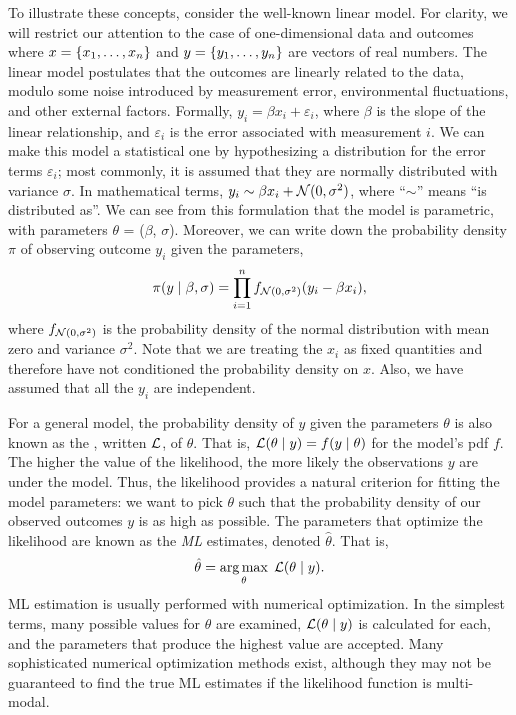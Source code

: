To illustrate these concepts, consider the well-known linear model. For
clarity, we will restrict our attention to the case of one-dimensional data and
outcomes where $x = \left\lbrace x_1, \ldots, x_n\right\rbrace$ and $y = \left\lbrace y_1, \ldots, y_n\right\rbrace$
are vectors of real numbers. The linear model postulates that the outcomes are
linearly related to the data, modulo some noise introduced by measurement
error, environmental fluctuations, and other external factors. Formally, $y_i =
\beta x_i + \varepsilon_i$, where $\beta$ is the slope of the linear
relationship, and $\varepsilon_i$ is the error associated with measurement $i$.
We can make this model a statistical one by hypothesizing a distribution for
the error terms $\varepsilon_i$; most commonly, it is assumed that they are
normally distributed with variance $\sigma$. In mathematical terms, $y_i \sim
\beta x_i + \mathcal{N}(0, \sigma^2)$, where ``$\sim$'' means ``is distributed as''. We
can see from this formulation that the model is parametric, with parameters
$\theta$ = ($\beta$, $\sigma$). Moreover, we can write down the probability
density $\pi$ of observing outcome $y_i$ given the parameters,
\[
  \pi(y \mid \beta, \sigma) = 
  \prod_{i=1}^n f_{\mathcal{N}(0, \sigma^2)} (y_i - \beta x_i),
\]
where $f_{\mathcal{N}(0, \sigma^2)}$ is the probability density of the normal
distribution with mean zero and variance $\sigma^2$. Note that we are treating
the $x_i$ as fixed quantities and therefore have not conditioned the
probability density on $x$. Also, we have assumed that all the $y_i$ are
independent.

For a general model, the probability density of $y$ given the parameters
$\theta$ is also known as the , written $\mathcal{L}$, of $\theta$.
That is, $\mathcal{L}(\theta \mid y) = f(y \mid \theta)$ for the model's \gls{pdf} $f$.
The higher the value of the likelihood, the more likely the observations $y$
are under the model. Thus, the likelihood provides a natural criterion for
fitting the model parameters: we want to pick $\theta$ such that the
probability density of our observed outcomes $y$ is as high as possible. The
parameters that optimize the likelihood are known as the \textit{\gls{ML}}
estimates, denoted $\hat{\theta}$. That is,
\[
  \hat{\theta} = \operatorname*{arg\,max}_\theta\; \mathcal{L}(\theta \mid y).
\]
\Gls{ML} estimation is usually performed with numerical optimization. In the
simplest terms, many possible values for $\theta$ are examined, $\mathcal{L}(\theta \mid
y)$ is calculated for each, and the parameters that produce the highest value
are accepted. Many sophisticated numerical optimization methods exist, although
they may not be guaranteed to find the true \gls{ML} estimates if the
likelihood function is multi-modal. 

